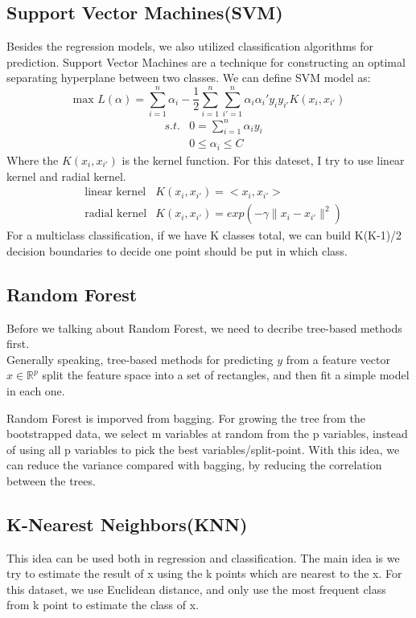 \documentclass[11pt]{article}
\begin{document}
\subsection{Support Vector Machines(SVM)}  
Besides the regression models, we also utilized classification algorithms for prediction. Support Vector Machines are a technique for constructing an optimal separating hyperplane between two classes. We can define SVM model as:$$\text{max }L(\alpha)=\sum_{i=1}^{n} \alpha_i - \frac{1}{2}\sum_{i=1}^{n}\sum_{i'=1}^{n}\alpha_i \alpha_i' y_i y_{i'} K(x_i,x_{i'})$$
    \begin{align}
        &s.t.  &0=\sum_{i=1}^{n} \alpha_iy_i \nonumber \\
        &      &0 \leq \alpha_i \leq C \nonumber
    \end{align}
Where the $K(x_i,x_{i'})$ is the kernel function. For this dateset, I try to use linear kernel and radial kernel.
    \begin{align}
        &\text{linear kernel}  &K(x_i,x_{i'})=<x_i,x_{i'}> \nonumber \\
        &\text{radial kernel}  &K(x_i,x_{i'})=exp(-\gamma \lVert x_i-x_{i'} \rVert^2) \nonumber
    \end{align}
For a multiclass classification, if we have K classes total, we can build K(K-1)/2 decision boundaries to decide one point should be put in which class.

\subsection{Random Forest} 
Before we talking about Random Forest, we need to decribe tree-based methods first.\\ 
Generally speaking, tree-based methods for predicting $y$ from a feature vector $x\in \mathbb{R}^p$ split the feature space into a set of rectangles, and then fit a simple model in each one.

Random Forest is imporved from bagging. For growing the tree from the bootstrapped data, we select m variables at random from the p variables, instead of using all p variables to pick the best variables/split-point. With this idea, we can reduce the variance compared with bagging, by reducing the correlation between the trees.

\subsection{K-Nearest Neighbors(KNN)} 
This idea can be used both in regression and classification. The main idea is we try to estimate the result of x using the k points which are nearest to the x. For this dataset, we use Euclidean distance, and only use the most frequent class from k point to estimate the class of x.
\end{document}
